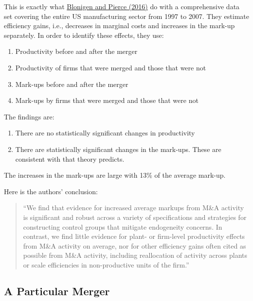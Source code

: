 \documentclass[
]{book}
\providecommand{\tightlist}{%
  \setlength{\itemsep}{0pt}\setlength{\parskip}{0pt}}
\begin{document}
This is exactly what \href{https://www.nber.org/system/files/working_papers/w22750/w22750.pdf}{Blonigen and Pierce (2016)} do with a comprehensive data set covering the entire US manufacturing sector from 1997 to 2007. They estimate efficiency gains, i.e., decreases in marginal costs and increases in the mark-up separately. In order to identify these effects, they use:

\begin{enumerate}
\def\labelenumi{\arabic{enumi}.}
\tightlist
\item
  Productivity before and after the merger
\item
  Productivity of firms that were merged and those that were not
\item
  Mark-ups before and after the merger
\item
  Mark-ups by firms that were merged and those that were not
\end{enumerate}

The findings are:

\begin{enumerate}
\def\labelenumi{\arabic{enumi}.}
\tightlist
\item
  There are no statistically significant changes in productivity
\item
  There are statistically significant changes in the mark-ups. These are consistent with that theory predicts.
\end{enumerate}

The increases in the mark-ups are large with 13\% of the average mark-up.

Here is the authors' conclusion:

\begin{quote}
``We find that evidence for increased average markups from M\&A activity is significant and robust across a variety of specifications and strategies for constructing control groups that mitigate endogeneity concerns. In contrast, we find little evidence for plant- or firm-level productivity effects from M\&A activity on average, nor for other efficiency gains often cited as possible from M\&A activity, including reallocation of activity across plants or scale efficiencies in non-productive units of the firm.''
\end{quote}

\hypertarget{a-particular-merger}{%
\subsection{A Particular Merger}\label{a-particular-merger}}
\end{document}
